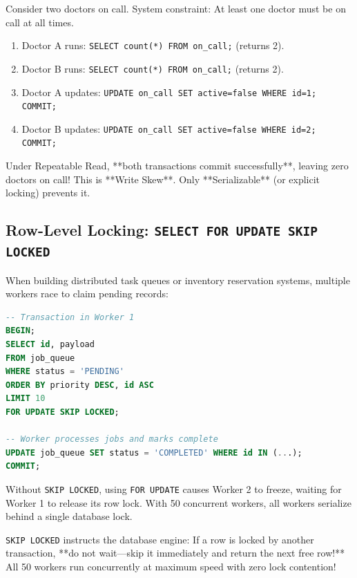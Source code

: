 \begin{intuitionbox}
Consider two doctors on call. System constraint: At least one doctor must be on call at all times. 
\begin{enumerate}
  \item Doctor A runs: \texttt{SELECT count(*) FROM on\_call;} (returns 2).
  \item Doctor B runs: \texttt{SELECT count(*) FROM on\_call;} (returns 2).
  \item Doctor A updates: \texttt{UPDATE on\_call SET active=false WHERE id=1; COMMIT;}
  \item Doctor B updates: \texttt{UPDATE on\_call SET active=false WHERE id=2; COMMIT;}
\end{enumerate}
Under Repeatable Read, **both transactions commit successfully**, leaving zero doctors on call! This is **Write Skew**. Only **Serializable** (or explicit locking) prevents it.
\end{intuitionbox}

\subsection{Row-Level Locking: \texttt{SELECT FOR UPDATE SKIP LOCKED}}

When building distributed task queues or inventory reservation systems, multiple workers race to claim pending records:

\begin{lstlisting}[language=SQL,caption={High-Throughput Queue Processing with \texttt{SKIP LOCKED}}]
-- Transaction in Worker 1
BEGIN;
SELECT id, payload
FROM job_queue
WHERE status = 'PENDING'
ORDER BY priority DESC, id ASC
LIMIT 10
FOR UPDATE SKIP LOCKED;

-- Worker processes jobs and marks complete
UPDATE job_queue SET status = 'COMPLETED' WHERE id IN (...);
COMMIT;
\end{lstlisting}

\begin{underthehoodbox}
Without \texttt{SKIP LOCKED}, using \texttt{FOR UPDATE} causes Worker 2 to freeze, waiting for Worker 1 to release its row lock. With 50 concurrent workers, all workers serialize behind a single database lock. 

\texttt{SKIP LOCKED} instructs the database engine: If a row is locked by another transaction, **do not wait—skip it immediately and return the next free row!** All 50 workers run concurrently at maximum speed with zero lock contention!
\end{underthehoodbox}

